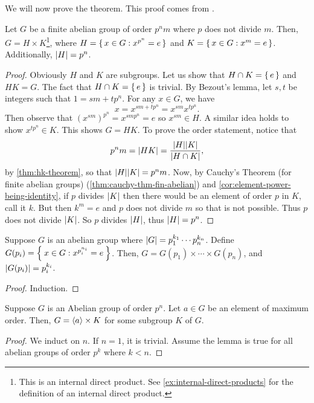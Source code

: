 \documentclass[./main.tex]{subfiles}
\begin{document}
We will now prove the theorem. This proof comes from \autocite[Ch~11]{Gallian_2020}. 

\begin{lemma}
    Let $G$ be a finite abelian group of order $p^n m$ where $p$ does not divide
    $m$. Then, $G = H \times K$\footnote{This is an internal direct product. See
    \cref{ex:internal-direct-products} for the definition of an internal direct
    product.}, where $H = \set{x \in G: x^{p^n} = e}$ and $K = \set{x \in G: x^m
    = e}$. Additionally, $\abs H = p^n$.
\end{lemma}
\begin{proof}
    Obviously $H$ and $K$ are subgroups. Let us show that $H \cap K = \set{e}$
    and $HK = G$. The fact that $H \cap K = \set{e}$ is trivial. By Bezout's
    lemma, let $s, t$ be integers such that $1 = sm + tp^n$. For any $x \in G$,
    we have
    \[
        x = x^{sm + tp^n} = x^{sm} x^{tp^n}.
    \]
    Then observe that $(x^{sm})^{p^n} = x^{sm p^n} = e$ so $x^{sm} \in H$. A
    similar idea holds to show $x^{tp^n} \in K$. This shows $G = HK$. To prove
    the order statement, notice that
    \[
        p^n m = \abs{HK} = \frac{\abs{H} \abs K}{\abs{H \cap K}},
    \]
    by \cref{thm:hk-theorem}, so that $\abs{H} \abs K = p^n m$. Now, by Cauchy's
    Theorem (for finite abelian groups) (\cref{thm:cauchy-thm-fin-abelian}) and
    \cref{cor:element-power-being-identity}, if $p$ divides $\abs K$ then there
    would be an element of order $p$ in $K$, call it $k$. But then $k^m  = e$
    and $p$ does not divide $m$ so that is not possible. Thus $p$ does not
    divide $\abs K$. So $p$ divides $\abs H$, thus $\abs{H} = p^n$.
\end{proof}

\begin{corollary}
    Suppose $G$ is an abelian group where $\abs{G} = p_1^{k_1} \cdots
    p_n^{k_n}$. Define $G(p_i) = \Set{x \in G : x^{p_i^{n_i}} = e}$. Then, $G =
    G(p_1) \times \cdots \times G(p_n)$, and $\abs{G(p_i)} = p_i^{k_i}$.
\end{corollary}
\begin{proof}
    Induction.
\end{proof}


\begin{lemma}
    Suppose $G$ is an Abelian group of order $p^n$. Let $a \in G$ be an element
    of maximum order. Then, $G = { \langle a \rangle } \times K$ for some subgroup $K$ of $G$.
\end{lemma}
\begin{proof}
    We induct on $n$. If $n=1$, it is trivial. Assume the lemma is true for all
    abelian groups of order $p^k$ where $k < n$.
\end{proof}
\end{document}
